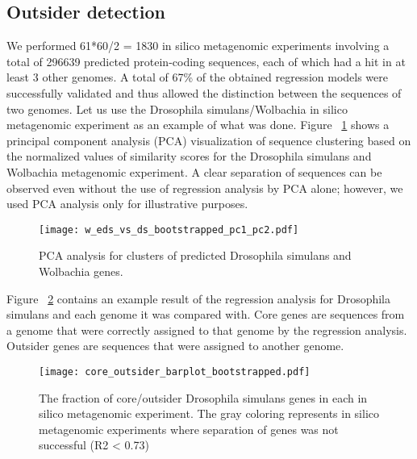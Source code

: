 \subsection{Outsider detection}
We performed 61*60/2 = 1830 in silico metagenomic experiments involving a total
of 296639 predicted protein-coding sequences, each of which had a hit in at
least 3 other genomes. A total of 67\% of the obtained regression models were
successfully validated and thus allowed the distinction between the sequences
of two genomes. Let us use the Drosophila simulans/Wolbachia in silico
metagenomic experiment as an example of what was done. Figure
~\ref{fig:pca_analysis} shows a principal component analysis (PCA)
visualization of sequence clustering based on the normalized values of
similarity scores for the Drosophila simulans and Wolbachia metagenomic
experiment. A clear separation of sequences can be observed even without the
use of regression analysis by PCA alone; however, we used PCA analysis only for
illustrative purposes.
\begin{center}
\begin{figure}
\texttt{[image: w\_eds\_vs\_ds\_bootstrapped\_pc1\_pc2.pdf]}
\caption{PCA analysis for clusters of predicted Drosophila simulans
	and Wolbachia genes.}
\label{fig:pca_analysis}
\end{figure}
\end{center}
Figure ~\ref{fig:rsquared_barplot} contains an example result of the regression analysis for Drosophila
simulans and each genome it was compared with. Core genes are sequences from a
genome that were correctly assigned to that genome by the regression analysis.
Outsider genes are sequences that were assigned to another genome.
\begin{center}
\begin{figure}
\texttt{[image: core\_outsider\_barplot\_bootstrapped.pdf]}
\caption{The fraction of core/outsider Drosophila simulans genes in each in
	silico metagenomic experiment. The gray coloring represents in silico
		metagenomic experiments where separation of genes was not successful (R2 <
				0.73)}
\label{fig:rsquared_barplot}
\end{figure}
\end{center}

